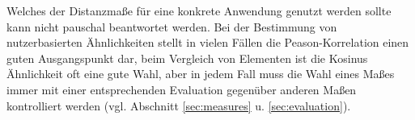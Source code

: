 Welches der Distanzmaße für eine konkrete Anwendung genutzt werden sollte kann nicht pauschal beantwortet werden. Bei der Bestimmung von nutzerbasierten Ähnlichkeiten stellt in vielen Fällen die Peason-Korrelation einen guten Ausgangspunkt dar, beim Vergleich von Elementen ist die Kosinus Ähnlichkeit oft eine gute Wahl, aber in jedem Fall muss die Wahl eines Maßes immer mit einer entsprechenden Evaluation gegenüber anderen Maßen kontrolliert werden (vgl. Abschnitt \ref{sec:measures} u. \ref{sec:evaluation}).

